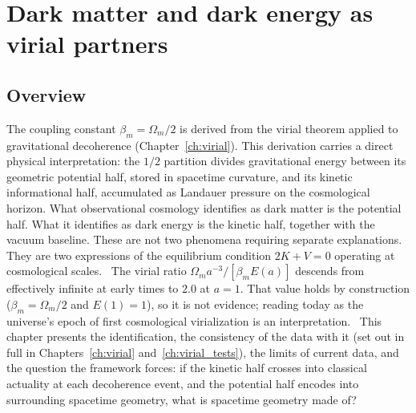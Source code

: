 
\chapter{Dark matter and dark energy as virial partners}\label{ch:virial_partners}

\section*{Overview}
The coupling constant $\beta_m=\Omega_m/2$ is derived from the virial theorem applied to gravitational decoherence (Chapter~\ref{ch:virial}). This
derivation carries a direct physical interpretation: the $1/2$ partition divides gravitational energy between its geometric potential half, stored in
spacetime curvature, and its kinetic informational half, accumulated as Landauer pressure on the cosmological horizon. What observational cosmology
identifies as dark matter is the potential half. What it identifies as dark energy is the kinetic half, together with the vacuum baseline. These are not two
phenomena requiring separate explanations. They are two expressions of the equilibrium condition $2K+V=0$ operating at cosmological scales.
\conjecture\ The virial ratio $\Omega_ma^{-3}/[\beta_mE(a)]$ descends from effectively infinite at early times to $2.0$ at $a=1$. That value holds by construction ($\beta_m=\Omega_m/2$ and
$E(1)=1$), so it is not evidence; reading today as the universe's epoch of first cosmological virialization is an interpretation. \interp\ This chapter presents the identification, the consistency of the data with it (set out in full in Chapters~\ref{ch:virial}
and~\ref{ch:virial_tests}), the limits of current data, and the question the framework forces: if the kinetic half crosses into classical actuality at each
decoherence event, and the potential half encodes into surrounding spacetime geometry, what is spacetime geometry made of?

